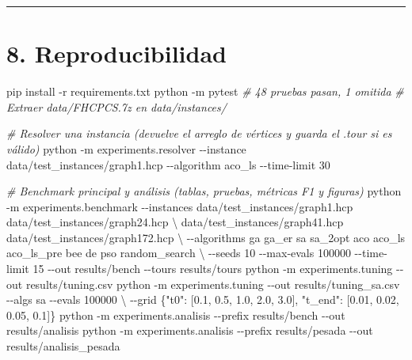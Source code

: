 \documentclass[
  spanish,
  12pt,
]{article}
\newenvironment{Shaded}{}{}
\newcommand{\AttributeTok}[1]{\textcolor[rgb]{0.49,0.56,0.16}{#1}}
\newcommand{\CommentTok}[1]{\textcolor[rgb]{0.38,0.63,0.69}{\textit{#1}}}
\newcommand{\DataTypeTok}[1]{\textcolor[rgb]{0.56,0.13,0.00}{#1}}
\newcommand{\ExtensionTok}[1]{#1}
\newcommand{\NormalTok}[1]{#1}
\newcommand{\StringTok}[1]{\textcolor[rgb]{0.25,0.44,0.63}{#1}}
\begin{document}
\begin{center}\rule{0.5\linewidth}{0.5pt}\end{center}

\section{8. Reproducibilidad}\label{reproducibilidad}

\begin{Shaded}
\begin{Highlighting}[]
\ExtensionTok{pip}\NormalTok{ install }\AttributeTok{{-}r}\NormalTok{ requirements.txt}
\ExtensionTok{python} \AttributeTok{{-}m}\NormalTok{ pytest                          }\CommentTok{\# 48 pruebas pasan, 1 omitida}
\CommentTok{\# Extraer data/FHCPCS.7z en data/instances/}

\CommentTok{\# Resolver una instancia (devuelve el arreglo de vértices y guarda el .tour si es válido)}
\ExtensionTok{python} \AttributeTok{{-}m}\NormalTok{ experiments.resolver }\AttributeTok{{-}{-}instance}\NormalTok{ data/test_instances/graph1.hcp }\AttributeTok{{-}{-}algorithm}\NormalTok{ aco\_ls }\AttributeTok{{-}{-}time{-}limit}\NormalTok{ 30}

\CommentTok{\# Benchmark principal y análisis (tablas, pruebas, métricas F1 y figuras)}
\ExtensionTok{python} \AttributeTok{{-}m}\NormalTok{ experiments.benchmark }\AttributeTok{{-}{-}instances}\NormalTok{ data/test_instances/graph1.hcp data/test_instances/graph24.hcp }\DataTypeTok{\textbackslash{}}
\NormalTok{    data/test_instances/graph41.hcp data/test_instances/graph172.hcp }\DataTypeTok{\textbackslash{}}
    \AttributeTok{{-}{-}algorithms}\NormalTok{ ga ga\_er sa sa\_2opt aco aco\_ls aco\_ls\_pre bee de pso random\_search }\DataTypeTok{\textbackslash{}}
    \AttributeTok{{-}{-}seeds}\NormalTok{ 10 }\AttributeTok{{-}{-}max{-}evals}\NormalTok{ 100000 }\AttributeTok{{-}{-}time{-}limit}\NormalTok{ 15 }\AttributeTok{{-}{-}out}\NormalTok{ results/bench }\AttributeTok{{-}{-}tours}\NormalTok{ results/tours}
\ExtensionTok{python} \AttributeTok{{-}m}\NormalTok{ experiments.tuning }\AttributeTok{{-}{-}out}\NormalTok{ results/tuning.csv}
\ExtensionTok{python} \AttributeTok{{-}m}\NormalTok{ experiments.tuning }\AttributeTok{{-}{-}out}\NormalTok{ results/tuning\_sa.csv }\AttributeTok{{-}{-}algs}\NormalTok{ sa }\AttributeTok{{-}{-}evals}\NormalTok{ 100000 }\DataTypeTok{\textbackslash{}}
    \AttributeTok{{-}{-}grid} \StringTok{\textquotesingle{}\{"t0": [0.1, 0.5, 1.0, 2.0, 3.0], "t\_end": [0.01, 0.02, 0.05, 0.1]\}\textquotesingle{}}
\ExtensionTok{python} \AttributeTok{{-}m}\NormalTok{ experiments.analisis }\AttributeTok{{-}{-}prefix}\NormalTok{ results/bench  }\AttributeTok{{-}{-}out}\NormalTok{ results/analisis}
\ExtensionTok{python} \AttributeTok{{-}m}\NormalTok{ experiments.analisis }\AttributeTok{{-}{-}prefix}\NormalTok{ results/pesada }\AttributeTok{{-}{-}out}\NormalTok{ results/analisis\_pesada}
\end{Highlighting}
\end{Shaded}
\end{document}
